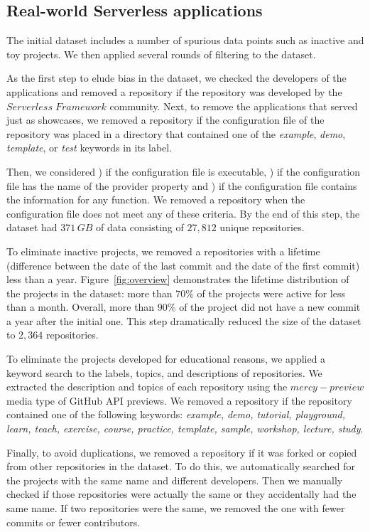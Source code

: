 \subsection{Real-world Serverless applications} \label{phaseB}
The initial dataset includes a number of spurious data points 
such as inactive and toy projects. We then applied several rounds 
of filtering to the dataset.

As the first step to elude bias in the dataset, we checked the developers 
of the applications and removed a repository if the repository was developed 
by the $Serverless \; Framework$ community. Next, to remove the applications 
that served just as showcases, we removed a repository if the configuration file 
of the repository was placed in a directory that contained one of the 
\emph{example}, \emph{demo}, \emph{template}, or \emph{test} 
keywords in its label.

Then, 
we considered ) if the configuration file is executable, ) if 
the configuration file has the name of the provider property and 
) if the configuration file contains the information for any 
function. We removed a repository when the configuration file
does not meet any of these criteria. 
%
By the end of this step, the dataset had $371 \, GB$ of data consisting 
of $27,812$ unique repositories. 

To eliminate inactive projects, we removed a repositories with a lifetime 
(difference between the date of the last commit and the date of the first commit)
less than a year. 
Figure~\ref{fig:overview} demonstrates the lifetime distribution of the 
projects in the dataset: more than $70\%$ of the projects 
were active for less than a month. Overall, more than $90\%$ 
of the project did not have a new commit a year after the initial one. 
This step dramatically reduced the size of the dataset to $2,364$ 
repositories.

To eliminate the projects developed for educational reasons, 
we applied a keyword search to the labels, topics, and 
descriptions of repositories. We extracted the description 
and topics of each repository using the $mercy-preview$ media 
type of GitHub API previews. We removed a repository 
if the repository contained one of the following keywords: 
\emph{example, demo, tutorial, playground, learn, teach, exercise, 
	course, practice, template, sample, workshop, lecture, study}.

Finally, to avoid duplications, we removed a repository if it was forked 
or copied from other repositories in the dataset. To do this, we automatically 
searched for the projects with the same name and different developers. 
Then we manually checked if those repositories were actually the same or 
they accidentally had the same name. If two repositories were the same, 
we removed the one with fewer commits or fewer contributors.






